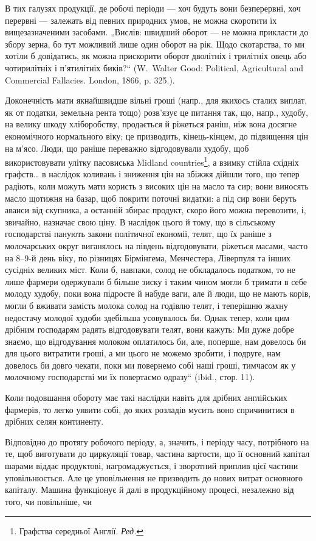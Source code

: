 
В тих галузях продукції, де робочі періоди — хоч будуть вони безперервні,
хоч перервні — залежать від певних природних умов, не можна
скоротити їх вищезазначеними засобами. „Вислів: швидший оборот — не
можна прикласти до збору зерна, бо тут можливий лише один оборот
на рік. Щодо скотарства, то ми хотіли б довідатись, як можна прискорити
оборот дволітніх і трилітніх овець або чотирилітніх і п’ятилітніх
биків?“ (W.~Walter Good: Political, Agricultural and Commercial Fallacies.
London, 1866, p. 325.).

Доконечність мати якнайшвидше вільні гроші (напр., для якихось сталих
виплат, як от податки, земельна рента тощо) розв’язує це питання
так, що, напр., худобу, на велику шкоду хліборобству, продається й
ріжеться раніш, ніж вона досягне економічного нормального віку; це
призводить, кінець-кінцем, до підвищення цін на м’ясо. Люди, що раніше
переважно відгодовували худобу, щоб використовувати улітку пасовиська
Midland countries\footnote*{
Графства середньої Англії. \emph{Ред.}
}, а взимку стійла східніх графств\dots{} в наслідок коливань
і зниження цін на збіжжя дійшли того, що тепер радіють, коли
можуть мати користь з високих цін на масло та сир; вони виносять масло
щотижня на базар, щоб покрити поточні видатки: а під сир вони беруть
аванси від скупника, а останній збирає продукт, скоро його можна перевозити,
і, звичайно, назначає свою ціну. В наслідок цього й тому, що
в сільському господарстві панують закони політичної економії, телят, що
їх раніше з молочарських округ виганялось на південь відгодовувати,
ріжеться масами, часто на 8--9-й день віку, по різницях Бірмінгема, Менчестера,
Ліверпуля та інших сусідніх великих міст. Коли б, навпаки,
солод не обкладалось податком, то не лише фармери одержували б більше
зиску і таким чином могли б тримати в себе молоду худобу, поки вона
підросте й набуде ваги, але й люди, що не мають корів, могли б вживати
замість молока солод на годівлю телят, і теперішню жахну недостачу
молодої худоби здебільша усовувалось би. Однак тепер, коли цим
дрібним господарям радять відгодовувати телят, вони кажуть: Ми дуже
добре знаємо, що відгодування молоком оплатилось би, але, поперше,
нам довелось би для цього витратити гроші, а ми цього не можемо зробити,
і подруге, нам довелось би довго чекати, поки ми повернемо собі
наші гроші, тимчасом як у молочному господарстві ми їх повертаємо
одразу“ (ibid., стор. 11).

Коли подовшання обороту має такі наслідки навіть для дрібних англійських
фармерів, то легко уявити собі, до яких розладів мусить воно
спричинитися в дрібних селян континенту.

Відповідно до протягу робочого періоду, а, значить, і періоду часу,
потрібного на те, щоб виготувати до циркуляції товар, частина вартости,
що її основний капітал шарами віддає продуктові, нагромаджується, і
зворотний приплив цієї частини уповільнюється. Але це уповільнення не
призводить до нових витрат основного капіталу. Машина функціонує й
далі в продукційному процесі, незалежно від того, чи повільніше, чи
\parbreak{}  %
